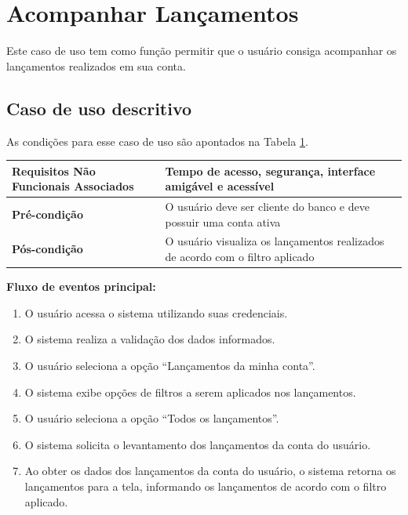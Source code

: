 \section{Acompanhar Lançamentos}

Este caso de uso tem como função permitir que o usuário consiga acompanhar os lançamentos realizados em sua conta.

\subsection{Caso de uso descritivo}

As condições para esse caso de uso são apontados na Tabela \ref{tab:acompanharLancamento}.

\begin{table}[h]
  \centering
  \begin{tabular}{|p{4cm} | p{10cm} |}
      \hline
      \small{\textbf{Requisitos Não Funcionais Associados}}	&	Tempo de acesso, segurança, interface amigável e acessível	\\ \hline
      \small{\textbf{Pré-condição}}	&	O usuário deve ser cliente do banco e deve possuir uma conta ativa	\\ \hline
      \small{\textbf{Pós-condição}}	&	O usuário visualiza os lançamentos realizados de acordo com o filtro aplicado	\\ \hline
    \end{tabular}
 \label{tab:acompanharLancamento}
\end{table}

\textbf{Fluxo de eventos principal:}

\begin{enumerate}
  \item O usuário acessa o sistema utilizando suas credenciais.
  \item O sistema realiza a validação dos dados informados.
  \item O usuário seleciona a opção ``Lançamentos da minha conta''.
  \item O sistema exibe opções de filtros a serem aplicados nos lançamentos.
  \item O usuário seleciona a opção ``Todos os lançamentos''.
  \item O sistema solicita o levantamento dos lançamentos da conta do usuário.
  \item Ao obter os dados dos lançamentos da conta do usuário, o sistema retorna os lançamentos para a tela, informando os lançamentos de acordo com o filtro aplicado.
\end{enumerate}

